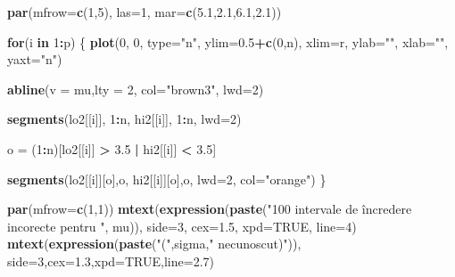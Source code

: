 \documentclass[]{article}
\newenvironment{Shaded}{\begin{snugshade}}{\end{snugshade}}
\newcommand{\KeywordTok}[1]{\textcolor[rgb]{0.13,0.29,0.53}{\textbf{#1}}}
\newcommand{\DataTypeTok}[1]{\textcolor[rgb]{0.13,0.29,0.53}{#1}}
\newcommand{\DecValTok}[1]{\textcolor[rgb]{0.00,0.00,0.81}{#1}}
\newcommand{\FloatTok}[1]{\textcolor[rgb]{0.00,0.00,0.81}{#1}}
\newcommand{\StringTok}[1]{\textcolor[rgb]{0.31,0.60,0.02}{#1}}
\newcommand{\OtherTok}[1]{\textcolor[rgb]{0.56,0.35,0.01}{#1}}
\newcommand{\ControlFlowTok}[1]{\textcolor[rgb]{0.13,0.29,0.53}{\textbf{#1}}}
\newcommand{\OperatorTok}[1]{\textcolor[rgb]{0.81,0.36,0.00}{\textbf{#1}}}
\newcommand{\NormalTok}[1]{#1}
\begin{document}
\begin{Shaded}
\begin{Highlighting}[]
\KeywordTok{par}\NormalTok{(}\DataTypeTok{mfrow=}\KeywordTok{c}\NormalTok{(}\DecValTok{1}\NormalTok{,}\DecValTok{5}\NormalTok{), }\DataTypeTok{las=}\DecValTok{1}\NormalTok{, }\DataTypeTok{mar=}\KeywordTok{c}\NormalTok{(}\FloatTok{5.1}\NormalTok{,}\FloatTok{2.1}\NormalTok{,}\FloatTok{6.1}\NormalTok{,}\FloatTok{2.1}\NormalTok{))}

\ControlFlowTok{for}\NormalTok{(i }\ControlFlowTok{in} \DecValTok{1}\OperatorTok{:}\NormalTok{p) \{}
  \KeywordTok{plot}\NormalTok{(}\DecValTok{0}\NormalTok{, }\DecValTok{0}\NormalTok{,}
       \DataTypeTok{type=}\StringTok{"n"}\NormalTok{,}
       \DataTypeTok{ylim=}\FloatTok{0.5}\OperatorTok{+}\KeywordTok{c}\NormalTok{(}\DecValTok{0}\NormalTok{,n),}
       \DataTypeTok{xlim=}\NormalTok{r,}
       \DataTypeTok{ylab=}\StringTok{""}\NormalTok{,}
       \DataTypeTok{xlab=}\StringTok{""}\NormalTok{,}
       \DataTypeTok{yaxt=}\StringTok{"n"}\NormalTok{)}
  
  \KeywordTok{abline}\NormalTok{(}\DataTypeTok{v =}\NormalTok{ mu,}\DataTypeTok{lty =} \DecValTok{2}\NormalTok{, }\DataTypeTok{col=}\StringTok{"brown3"}\NormalTok{, }\DataTypeTok{lwd=}\DecValTok{2}\NormalTok{)}
  
  \KeywordTok{segments}\NormalTok{(lo2[[i]], }\DecValTok{1}\OperatorTok{:}\NormalTok{n,}
\NormalTok{           hi2[[i]], }\DecValTok{1}\OperatorTok{:}\NormalTok{n,}
           \DataTypeTok{lwd=}\DecValTok{2}\NormalTok{)}
  
\NormalTok{  o =}\StringTok{ }\NormalTok{(}\DecValTok{1}\OperatorTok{:}\NormalTok{n)[lo2[[i]] }\OperatorTok{>}\StringTok{ }\FloatTok{3.5} \OperatorTok{|}\StringTok{ }\NormalTok{hi2[[i]] }\OperatorTok{<}\StringTok{ }\FloatTok{3.5}\NormalTok{]}
  
  \KeywordTok{segments}\NormalTok{(lo2[[i]][o],o,}
\NormalTok{           hi2[[i]][o],o,}
           \DataTypeTok{lwd=}\DecValTok{2}\NormalTok{, }\DataTypeTok{col=}\StringTok{"orange"}\NormalTok{)}
\NormalTok{\}}

\KeywordTok{par}\NormalTok{(}\DataTypeTok{mfrow=}\KeywordTok{c}\NormalTok{(}\DecValTok{1}\NormalTok{,}\DecValTok{1}\NormalTok{))}
\KeywordTok{mtext}\NormalTok{(}\KeywordTok{expression}\NormalTok{(}\KeywordTok{paste}\NormalTok{(}\StringTok{"100 intervale de încredere incorecte pentru "}\NormalTok{, mu)), }
      \DataTypeTok{side=}\DecValTok{3}\NormalTok{, }\DataTypeTok{cex=}\FloatTok{1.5}\NormalTok{, }\DataTypeTok{xpd=}\OtherTok{TRUE}\NormalTok{, }\DataTypeTok{line=}\DecValTok{4}\NormalTok{)}
\KeywordTok{mtext}\NormalTok{(}\KeywordTok{expression}\NormalTok{(}\KeywordTok{paste}\NormalTok{(}\StringTok{"("}\NormalTok{,sigma,}\StringTok{" necunoscut)"}\NormalTok{)),}
      \DataTypeTok{side=}\DecValTok{3}\NormalTok{,}\DataTypeTok{cex=}\FloatTok{1.3}\NormalTok{,}\DataTypeTok{xpd=}\OtherTok{TRUE}\NormalTok{,}\DataTypeTok{line=}\FloatTok{2.7}\NormalTok{)}
\end{Highlighting}
\end{Shaded}
\end{document}
